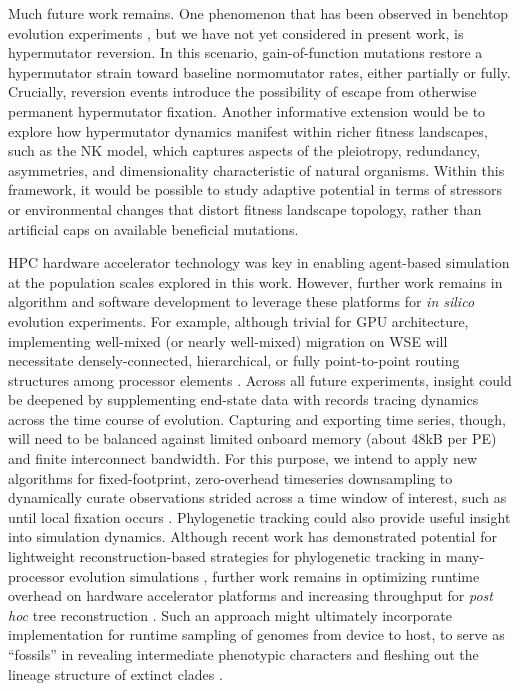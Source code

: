 Much future work remains.
One phenomenon that has been observed in benchtop evolution experiments \citep{ho2021evolutionary}, but we have not yet considered in present work, is hypermutator reversion.
In this scenario, gain-of-function mutations restore a hypermutator strain toward baseline normomutator rates, either partially or fully.
Crucially, reversion events introduce the possibility of escape from otherwise permanent hypermutator fixation.
Another informative extension would be to explore how hypermutator dynamics manifest within richer fitness landscapes, such as the NK model, which captures aspects of the pleiotropy, redundancy, asymmetries, and dimensionality characteristic of natural organisms.
Within this framework, it would be possible to study adaptive potential in terms of stressors or environmental changes that distort fitness landscape topology, rather than artificial caps on available beneficial mutations.

HPC hardware accelerator technology was key in enabling agent-based simulation at the population scales explored in this work.
However, further work remains in algorithm and software development to leverage these platforms for \textit{in silico} evolution experiments.
For example, although trivial for GPU architecture, implementing well-mixed (or nearly well-mixed) migration on WSE will necessitate densely-connected, hierarchical, or fully point-to-point routing structures among processor elements \citep{james2020physical,luczynski2024near}.
Across all future experiments, insight could be deepened by supplementing end-state data with records tracing dynamics across the time course of evolution.
Capturing and exporting time series, though, will need to be balanced against limited onboard memory (about 48kB per PE) and finite interconnect bandwidth.
For this purpose, we intend to apply new algorithms for fixed-footprint, zero-overhead timeseries downsampling to dynamically curate observations strided across a time window of interest, such as until local fixation occurs \citep{moreno2024structured}.
Phylogenetic tracking could also provide useful insight into simulation dynamics.
Although recent work has demonstrated potential for lightweight reconstruction-based strategies for phylogenetic tracking in many-processor evolution simulations \citep{moreno2022hereditary}, further work remains in optimizing runtime overhead on hardware accelerator platforms and increasing throughput for \textit{post hoc} tree reconstruction \citep{moreno2024trackable,moreno2024analysis}.
Such an approach might ultimately incorporate implementation for runtime sampling of genomes from device to host, to serve as ``fossils'' in revealing intermediate phenotypic characters and fleshing out the lineage structure of extinct clades \citep{moreno2024guide}.

